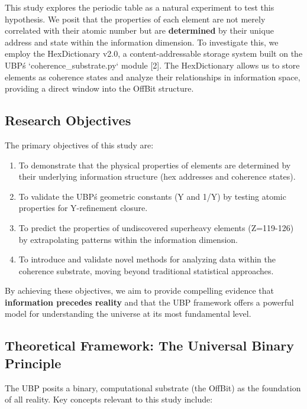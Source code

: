 \documentclass[12pt, a4paper]{article}
\begin{document}
This study explores the periodic table as a natural experiment to test this hypothesis. We posit that the properties of each element are not merely correlated with their atomic number but are \textbf{determined} by their unique address and state within the information dimension. To investigate this, we employ the HexDictionary v2.0, a content-addressable storage system built on the UBP\'s `coherence\_substrate.py` module [2]. The HexDictionary allows us to store elements as coherence states and analyze their relationships in information space, providing a direct window into the OffBit structure.

\subsection{Research Objectives}

The primary objectives of this study are:
\begin{enumerate}
    \item To demonstrate that the physical properties of elements are determined by their underlying information structure (hex addresses and coherence states).
    \item To validate the UBP\'s geometric constants (Y and 1/Y) by testing atomic properties for Y-refinement closure.
    \item To predict the properties of undiscovered superheavy elements (Z=119-126) by extrapolating patterns within the information dimension.
    \item To introduce and validate novel methods for analyzing data within the coherence substrate, moving beyond traditional statistical approaches.
\end{enumerate}

By achieving these objectives, we aim to provide compelling evidence that \textbf{information precedes reality} and that the UBP framework offers a powerful model for understanding the universe at its most fundamental level.

\subsection{Theoretical Framework: The Universal Binary Principle}

The UBP posits a binary, computational substrate (the OffBit) as the foundation of all reality. Key concepts relevant to this study include:
\end{document}

